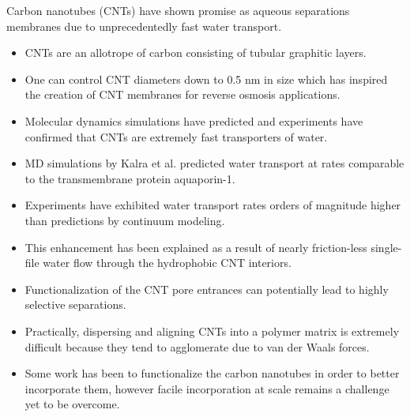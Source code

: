   Carbon nanotubes (CNTs) have shown promise as aqueous separations membranes
  due to unprecedentedly fast water transport.\cite{humplik_nanostructured_2011}
  \begin{itemize}
    \item CNTs are an allotrope of carbon consisting of tubular graphitic layers.~\cite{iijima_helical_1991}
    \item One can control CNT diameters down to 0.5 nm in size which has inspired the
    creation of CNT membranes for reverse osmosis applications.~\cite{sun_creating_2000}
    \item Molecular dynamics simulations have predicted and experiments have confirmed that
    CNTs are extremely fast transporters of water.~\cite{hummer_water_2001,joseph_why_2008}
    \item MD simulations by Kalra et al. predicted water transport at rates comparable
    to the transmembrane protein aquaporin-1.~\cite{kalra_osmotic_2003}
    \item Experiments have exhibited water transport rates orders of magnitude higher than 
    predictions by continuum modeling.~\cite{holt_fast_2006}
    \item This enhancement has been explained as a result of nearly friction-less single-file water
    flow through the hydrophobic CNT interiors.~\cite{kalra_osmotic_2003}
    \item Functionalization of the CNT pore entrances can potentially lead to highly selective separations.~\cite{fornasiero_ion_2008}
	\item Practically, dispersing and aligning CNTs into a polymer matrix is extremely
    difficult because they tend to agglomerate due to van der Waals forces.~\cite{sahoo_polymer_2010}
    \item Some work has been to functionalize the carbon nanotubes in order to better incorporate them,
    however facile incorporation at scale remains a challenge yet to be overcome.~\cite{kim_polysulfone_2007}
  \end{itemize}
  
